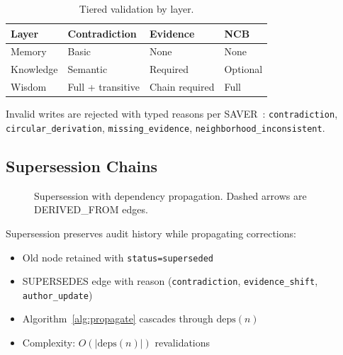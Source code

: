 \documentclass[11pt,a4paper]{article}
\begin{document}
\begin{table}[H]
\centering
\caption{Tiered validation by layer.}
\label{tab:validation}
\begin{tabular}{@{}llll@{}}
\toprule
\textbf{Layer} & \textbf{Contradiction} & \textbf{Evidence} & \textbf{NCB} \\
\midrule
Memory & Basic & None & None \\
Knowledge & Semantic & Required & Optional \\
Wisdom & Full + transitive & Chain required & Full \\
\bottomrule
\end{tabular}
\end{table}

Invalid writes are rejected with typed reasons per SAVER~\cite{yuan2026saver}: \texttt{contradiction}, \texttt{circular\_derivation}, \texttt{missing\_evidence}, \texttt{neighborhood\_inconsistent}.

\subsection{Supersession Chains}

\begin{figure}[H]
\centering
{}
\caption{Supersession with dependency propagation. Dashed arrows are \textsf{DERIVED\_FROM} edges.}
\label{fig:supersession}
\end{figure}

Supersession preserves audit history while propagating corrections:
\begin{itemize}[noitemsep]
    \item Old node retained with \texttt{status=superseded}
    \item SUPERSEDES edge with reason (\texttt{contradiction}, \texttt{evidence\_shift}, \texttt{author\_update})
    \item Algorithm~\ref{alg:propagate} cascades through $\text{deps}(n)$
    \item Complexity: $O(|\text{deps}(n)|)$ revalidations
\end{itemize}
\end{document}
